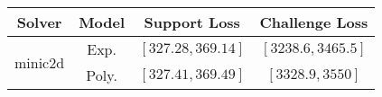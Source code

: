 \begin{tabular}{cc|c|c} 
\hline 
 Solver & Model & Support Loss  & Challenge Loss \tabularnewline\hline 
\hline 
\multirow{2}{*}{minic2d} & Exp. & $\left[327.28,369.14\right]$ & $\left[3238.6,3465.5\right]$ \tabularnewline 
 & Poly. & $\left[327.41,369.49\right]$ & $\left[3328.9,3550\right]$ \tabularnewline 
\hline 
\end{tabular} 

